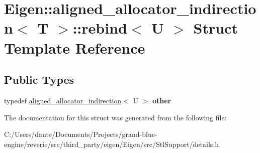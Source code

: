 \hypertarget{struct_eigen_1_1aligned__allocator__indirection_1_1rebind}{}\section{Eigen\+::aligned\+\_\+allocator\+\_\+indirection$<$ T $>$\+::rebind$<$ U $>$ Struct Template Reference}
\label{struct_eigen_1_1aligned__allocator__indirection_1_1rebind}
\subsection*{Public Types}
\begin{DoxyCompactItemize}
\item 
\mbox{\label{struct_eigen_1_1aligned__allocator__indirection_1_1rebind_accebeb01e8c70c6a047ecba5c6a8c545}} 
typedef \mbox{\hyperlink{class_eigen_1_1aligned__allocator__indirection}{aligned\+\_\+allocator\+\_\+indirection}}$<$ U $>$ {\bfseries other}
\end{DoxyCompactItemize}


The documentation for this struct was generated from the following file\+:\begin{DoxyCompactItemize}
\item 
C\+:/\+Users/dante/\+Documents/\+Projects/grand-\/blue-\/engine/reverie/src/third\+\_\+party/eigen/\+Eigen/src/\+Stl\+Support/details.\+h\end{DoxyCompactItemize}
